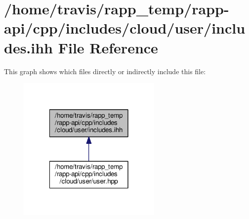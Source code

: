 \hypertarget{cloud_2user_2includes_8ihh}{\section{/home/travis/rapp\-\_\-temp/rapp-\/api/cpp/includes/cloud/user/includes.ihh File Reference}
\label{cloud_2user_2includes_8ihh}
}
This graph shows which files directly or indirectly include this file\-:
\nopagebreak
\begin{figure}[H]
\begin{center}
\leavevmode
\includegraphics[width=198pt]{cloud_2user_2includes_8ihh__dep__incl}
\end{center}
\end{figure}
